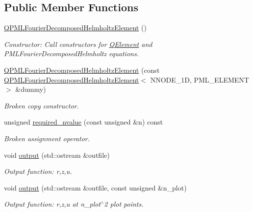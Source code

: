 \subsection*{Public Member Functions}
\begin{DoxyCompactItemize}
\item 
\hyperlink{classoomph_1_1QPMLFourierDecomposedHelmholtzElement_aa52e9e6c4b94eba4f6ee1f79b1eca325}{Q\+P\+M\+L\+Fourier\+Decomposed\+Helmholtz\+Element} ()
\begin{DoxyCompactList}\small\item\em Constructor\+: Call constructors for \hyperlink{classoomph_1_1QElement}{Q\+Element} and P\+M\+L\+Fourier\+Decomposed\+Helmholtz equations. \end{DoxyCompactList}\item 
\hyperlink{classoomph_1_1QPMLFourierDecomposedHelmholtzElement_ae8f7a33c18c1d8322f60923d6d59d622}{Q\+P\+M\+L\+Fourier\+Decomposed\+Helmholtz\+Element} (const \hyperlink{classoomph_1_1QPMLFourierDecomposedHelmholtzElement}{Q\+P\+M\+L\+Fourier\+Decomposed\+Helmholtz\+Element}$<$ N\+N\+O\+D\+E\+\_\+1D, P\+M\+L\+\_\+\+E\+L\+E\+M\+E\+NT $>$ \&dummy)
\begin{DoxyCompactList}\small\item\em Broken copy constructor. \end{DoxyCompactList}\item 
unsigned \hyperlink{classoomph_1_1QPMLFourierDecomposedHelmholtzElement_aebd313b676658a01062731cfa824829a}{required\+\_\+nvalue} (const unsigned \&n) const
\begin{DoxyCompactList}\small\item\em Broken assignment operator. \end{DoxyCompactList}\item 
void \hyperlink{classoomph_1_1QPMLFourierDecomposedHelmholtzElement_a27085df03fa3b5bc7a0bf02cd18808ed}{output} (std\+::ostream \&outfile)
\begin{DoxyCompactList}\small\item\em Output function\+: r,z,u. \end{DoxyCompactList}\item 
void \hyperlink{classoomph_1_1QPMLFourierDecomposedHelmholtzElement_afc5cf87a0704c5a139abdbd2bdf56e85}{output} (std\+::ostream \&outfile, const unsigned \&n\+\_\+plot)
\begin{DoxyCompactList}\small\item\em Output function\+: r,z,u at n\+\_\+plot$^\wedge$2 plot points. \end{DoxyCompactList}\item 

\end{DoxyCompactItemize}
